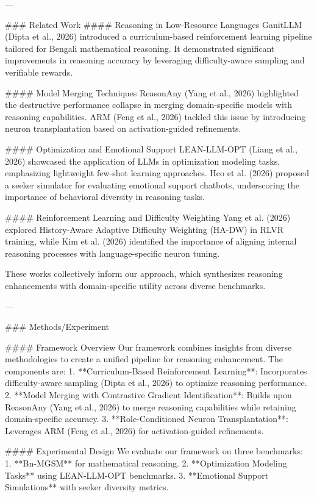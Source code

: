 ---

### Related Work  
#### Reasoning in Low-Resource Languages  
GanitLLM (Dipta et al., 2026) introduced a curriculum-based reinforcement learning pipeline tailored for Bengali mathematical reasoning. It demonstrated significant improvements in reasoning accuracy by leveraging difficulty-aware sampling and verifiable rewards.

#### Model Merging Techniques  
ReasonAny (Yang et al., 2026) highlighted the destructive performance collapse in merging domain-specific models with reasoning capabilities. ARM (Feng et al., 2026) tackled this issue by introducing neuron transplantation based on activation-guided refinements.

#### Optimization and Emotional Support  
LEAN-LLM-OPT (Liang et al., 2026) showcased the application of LLMs in optimization modeling tasks, emphasizing lightweight few-shot learning approaches. Heo et al. (2026) proposed a seeker simulator for evaluating emotional support chatbots, underscoring the importance of behavioral diversity in reasoning tasks.

#### Reinforcement Learning and Difficulty Weighting  
Yang et al. (2026) explored History-Aware Adaptive Difficulty Weighting (HA-DW) in RLVR training, while Kim et al. (2026) identified the importance of aligning internal reasoning processes with language-specific neuron tuning.

These works collectively inform our approach, which synthesizes reasoning enhancements with domain-specific utility across diverse benchmarks.

---

### Methods/Experiment  

#### Framework Overview  
Our framework combines insights from diverse methodologies to create a unified pipeline for reasoning enhancement. The components are:  
1. **Curriculum-Based Reinforcement Learning**: Incorporates difficulty-aware sampling (Dipta et al., 2026) to optimize reasoning performance.  
2. **Model Merging with Contrastive Gradient Identification**: Builds upon ReasonAny (Yang et al., 2026) to merge reasoning capabilities while retaining domain-specific accuracy.  
3. **Role-Conditioned Neuron Transplantation**: Leverages ARM (Feng et al., 2026) for activation-guided refinements.  

#### Experimental Design  
We evaluate our framework on three benchmarks:  
1. **Bn-MGSM** for mathematical reasoning.  
2. **Optimization Modeling Tasks** using LEAN-LLM-OPT benchmarks.  
3. **Emotional Support Simulations** with seeker diversity metrics.  

